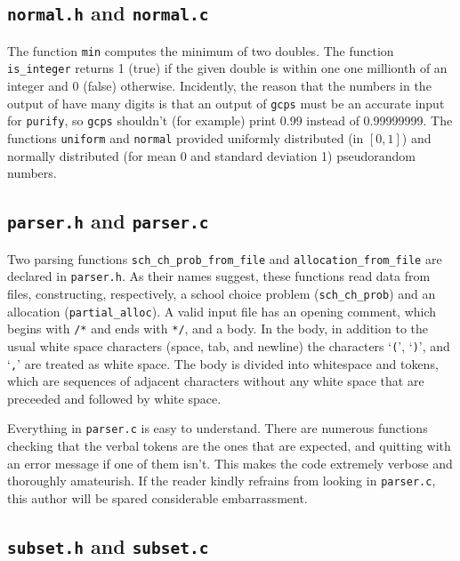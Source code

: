 \documentclass[12pt]{article}
\theoremstyle{definition}
\begin{document}
\begin{appendix}
\subsection{\texttt{normal.h} and \texttt{normal.c}}

The function \texttt{min} computes the minimum of two doubles.  The
function \texttt{is\_integer} returns 1 (true) if the given double is
within one one millionth of an integer and 0 (false) otherwise.
Incidently, the reason that the numbers in the output of 
have many digits is that an output of \texttt{gcps} must be an
accurate input for \texttt{purify}, so \texttt{gcps} shouldn't (for
example) print 0.99 instead of 0.99999999. The functions
\texttt{uniform} and \texttt{normal} provided uniformly distributed
(in $[0,1]$) and normally distributed (for mean 0 and standard
deviation 1) pseudorandom numbers.

\subsection{\texttt{parser.h} and \texttt{parser.c}}

Two parsing functions \texttt{sch\_ch\_prob\_from\_file} and
\texttt{allocation\_from\_file} are declared in \texttt{parser.h}.  As
their names suggest, these functions read data from files,
constructing, respectively, a school choice problem
(\texttt{sch\_ch\_prob}) and an allocation (\texttt{partial\_alloc}).
A valid input file has an opening comment, which begins with
\texttt{/*} and ends with \texttt{*/}, and a body.  In the body, in
addition to the usual white space characters (space, tab, and newline)
the characters `\texttt{(}', `\texttt{)}', and `\texttt{,}' are
treated as white space.  The body is divided into whitespace and
tokens, which are sequences of adjacent characters without any white
space that are preceeded and followed by white space.

Everything in \texttt{parser.c} is easy to understand.  There are
numerous functions checking that the verbal tokens are the ones that
are expected, and quitting with an error message if one of them
isn't. This makes the code extremely verbose and thoroughly
amateurish.  If the reader kindly refrains from looking in
\texttt{parser.c}, this author will be spared considerable
embarrassment.

\subsection{\texttt{subset.h} and \texttt{subset.c}}


\end{appendix}
\end{document}
